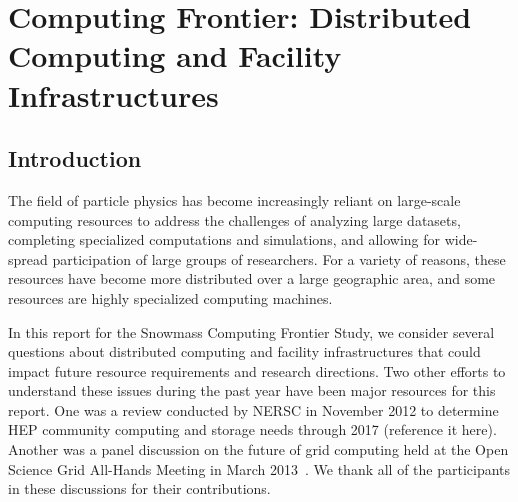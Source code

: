  
\chapter{Computing Frontier: Distributed Computing and Facility Infrastructures}
\label{chap:mag}


\begin{center}\begin{boldmath}



\end{boldmath}\end{center}


\section{Introduction}
\label{sec:comp-intro}

The field of particle physics has become increasingly reliant on large-scale computing resources to address the challenges of analyzing large datasets, completing specialized computations and simulations, and allowing for wide-spread participation of large groups of researchers.  For a variety of reasons, these resources have become more distributed over a large geographic area, and some resources are highly specialized computing machines.

In this report for the Snowmass Computing Frontier Study, we consider several questions about distributed computing and facility infrastructures that could impact future resource requirements and research directions.  Two other efforts to understand these issues during the past year have been major resources for this report.  One was a review conducted by NERSC in November 2012 to determine HEP community computing and storage needs through 2017 (reference it here).  Another was a panel discussion on the future of grid computing held at the Open Science Grid All-Hands Meeting in March 2013~\cite{bib:OSGpanel}.  We thank all of the participants in these discussions for their contributions.

